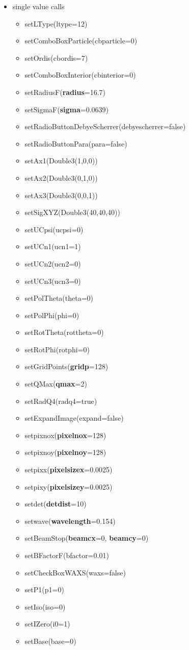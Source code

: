 \documentclass[11pt]{article} %
\begin{document}
\begin{itemize}
\item single value calls
\begin{itemize}\itemsep0pt
\item setLType(ltype=12)
\item setComboBoxParticle(cbparticle=0)
\item setOrdis(cbordis=7)
\item setComboBoxInterior(cbinterior=0)
\item setRadiusF({\bf radius}=16.7)
\item setSigmaF({\bf sigma}=0.0639)
\item setRadioButtonDebyeScherrer(debyescherrer=false)
\item setRadioButtonPara(para=false)
\item setAx1(Double3(1,0,0))
\item setAx2(Double3(0,1,0))
\item setAx3(Double3(0,0,1))
\item setSigXYZ(Double3(40,40,40))
\item setUCpsi(ucpsi=0)
\item setUCn1(ucn1=1)
\item setUCn2(ucn2=0)
\item setUCn3(ucn3=0)
\item setPolTheta(theta=0)
\item setPolPhi(phi=0)
\item setRotTheta(rottheta=0)
\item setRotPhi(rotphi=0)
\item setGridPoints({\bf gridp}=128)
\item setQMax({\bf qmax}=2)
\item setRadQ4(radq4=true)
\item setExpandImage(expand=false)
\item setpixnox({\bf pixelnox}=128)
\item setpixnoy({\bf pixelnoy}=128)
\item setpixx({\bf pixelsizex}=0.0025)
\item setpixy({\bf pixelsizey}=0.0025)
\item setdet({\bf detdist}=10)
\item setwave({\bf wavelength}=0.154)
\item setBeamStop({\bf beamcx}=0, {\bf beamcy}=0)
\item setBFactorF(bfactor=0.01)
\item setCheckBoxWAXS(waxs=false)
\item setP1(p1=0)
\item setIso(iso=0)
\item setIZero(i0=1)
\item setBase(base=0)
\end{itemize}
\end{itemize}
\end{document}
